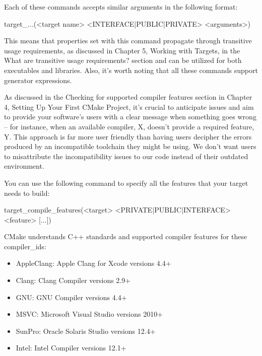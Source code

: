 Each of these commands accepts similar arguments in the following format:

\begin{shell}
target_...(<target name> <INTERFACE|PUBLIC|PRIVATE> <arguments>)
\end{shell}

This means that properties set with this command propagate through transitive usage requirements, as discussed in Chapter 5, Working with Targets, in the What are transitive usage requirements? section and can be utilized for both executables and libraries. Also, it’s worth noting that all these commands support generator expressions.


As discussed in the Checking for supported compiler features section in Chapter 4, Setting Up Your First CMake Project, it’s crucial to anticipate issues and aim to provide your software’s users with a clear message when something goes wrong – for instance, when an available compiler, X, doesn’t provide a required feature, Y. This approach is far more user friendly than having users decipher the errors produced by an incompatible toolchain they might be using. We don’t want users to misattribute the incompatibility issues to our code instead of their outdated environment.

You can use the following command to specify all the features that your target needs to build:

\begin{shell}
target_compile_features(<target> <PRIVATE|PUBLIC|INTERFACE>
                        <feature> [...])
\end{shell}

CMake understands C++ standards and supported compiler features for these compiler\_ids:

\begin{itemize}
\item
AppleClang: Apple Clang for Xcode versions 4.4+

\item
Clang: Clang Compiler versions 2.9+

\item
GNU: GNU Compiler versions 4.4+

\item
MSVC: Microsoft Visual Studio versions 2010+

\item
SunPro: Oracle Solaris Studio versions 12.4+

\item
Intel: Intel Compiler versions 12.1+
\end{itemize}

